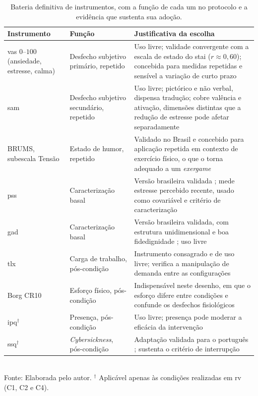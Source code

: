 \begin{table}[H]
    \centering
    \caption{Bateria definitiva de instrumentos, com a função de cada um no protocolo e a evidência que sustenta sua adoção.}
    \label{tab:bateria}
    \small
    \begin{tabularx}{\textwidth}{p{2.7cm}p{3.1cm}Y}
        \toprule
        \textbf{Instrumento} & \textbf{Função} & \textbf{Justificativa da escolha} \\
        \midrule
        \gls{vas} $0$--$100$ (ansiedade, estresse, calma) & Desfecho subjetivo primário, repetido & Uso livre; validade convergente com a escala de estado do \gls{stai} ($r \approx 0{,}60$); concebida para medidas repetidas e sensível a variação de curto prazo \citep{Facco2011} \\
        \addlinespace
        \gls{sam} & Desfecho subjetivo secundário, repetido & Uso livre; pictórico e não verbal, dispensa tradução; cobre valência e ativação, dimensões distintas que a redução de estresse pode afetar separadamente \citep{BradleyLang1994} \\
        \addlinespace
        BRUMS, subescala Tensão & Estado de humor, repetido & Validado no Brasil e concebido para aplicação repetida em contexto de exercício físico, o que o torna adequado a um \textit{exergame} \citep{Rohlfs2008} \\
        \addlinespace
        \gls{pss} & Caracterização basal & Versão brasileira validada \citep{Luft2007}; mede estresse percebido recente, usado como covariável e critério de caracterização \\
        \addlinespace
        \gls{gad} & Caracterização basal & Versão brasileira validada, com estrutura unidimensional e boa fidedignidade \citep{Moreno2016}; uso livre \\
        \addlinespace
        \gls{tlx} & Carga de trabalho, pós-condição & Instrumento consagrado e de uso livre; verifica a manipulação de demanda entre as configurações \citep{HartStaveland1988} \\
        \addlinespace
        Borg CR10 & Esforço físico, pós-condição & Indispensável neste desenho, em que o esforço difere entre condições e confunde os desfechos fisiológicos \citep{Borg1982} \\
        \addlinespace
        \gls{ipq}$^{\dagger}$ & Presença, pós-condição & Uso livre; presença pode moderar a eficácia da intervenção \citep{Schubert2001} \\
        \addlinespace
        \gls{ssq}$^{\dagger}$ & \textit{Cybersickness}, pós-condição & Adaptação validada para o português \citep{Goncalves2024}; sustenta o critério de interrupção \\
        \bottomrule
    \end{tabularx}\\[2pt]
    {\footnotesize Fonte: Elaborada pelo autor. $^{\dagger}$ Aplicável apenas às condições realizadas em \gls{rv} (C1, C2 e C4).}
\end{table}

